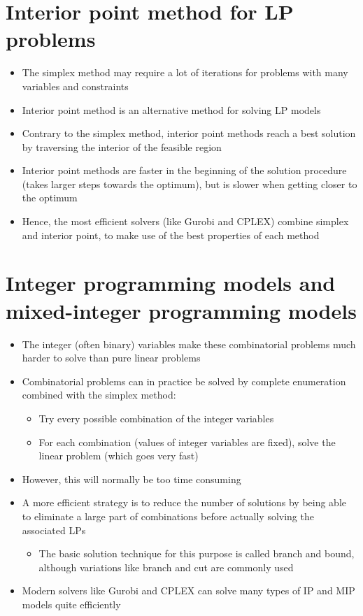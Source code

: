 \documentclass[10pt]{article}
\begin{document}
\section{Interior point method for LP problems}
\begin{itemize}
    \item The simplex method may require a lot of iterations for problems with many variables and constraints 
    \item Interior point method is an alternative method for solving LP models 
    \item Contrary to the simplex method, interior point methods reach a best solution by traversing the interior of the feasible region 
    \item Interior point methods are faster in the beginning of the solution procedure (takes larger steps towards the optimum), but is slower when getting closer to the optimum
    \item Hence, the most efficient solvers (like Gurobi and CPLEX) combine simplex and interior point, to make use of the best properties of each method 
\end{itemize}
\section{Integer programming models and mixed-integer programming models}
\begin{itemize}
    \item The integer (often binary) variables make these combinatorial problems much harder to solve than pure linear problems 
    \item Combinatorial problems can in practice be solved by complete enumeration combined with the simplex method: 
    \begin{itemize}
        \item Try every possible combination of the integer variables 
        \item For each combination (values of integer variables are fixed), solve the linear problem (which goes very fast)
    \end{itemize}
    \item However, this will normally be too time consuming 
    \item A more efficient strategy is to reduce the number of solutions by being able to eliminate a large part of combinations before actually solving the associated LPs
    \begin{itemize}
        \item The basic solution technique for this purpose is called branch and bound, although variations like branch and cut are commonly used 
    \end{itemize}
    \item Modern solvers like Gurobi and CPLEX can solve many types of IP and MIP models quite efficiently 
\end{itemize}
\end{document}

